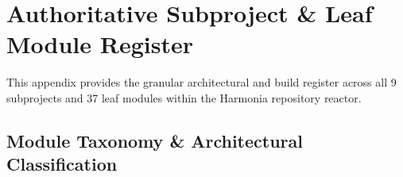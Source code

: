 
\chapter{Authoritative Subproject \& Leaf Module Register}
\label{app:module_register}

This appendix provides the granular architectural and build register across all 9 subprojects and 37 leaf modules within the Harmonia repository reactor.

\section{Module Taxonomy \& Architectural Classification}


